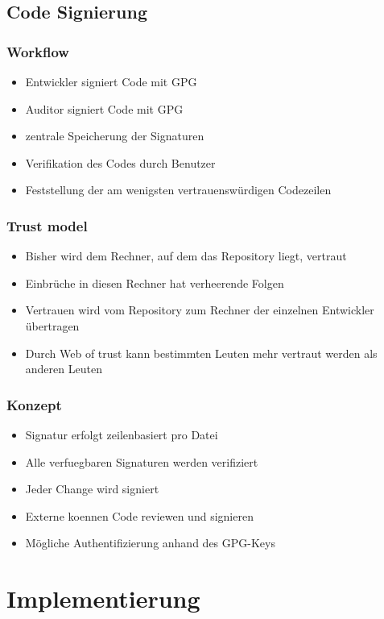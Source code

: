 \documentclass[german]{beamer}
\begin{document}
\subsection{Code Signierung}

\begin{frame}
  \frametitle{Workflow}
  \begin{itemize}
  \item Entwickler signiert Code mit GPG
  \item Auditor signiert Code mit GPG
  \item zentrale Speicherung der Signaturen
  \item Verifikation des Codes durch Benutzer
  \item Feststellung der am wenigsten vertrauensw\"urdigen Codezeilen
  \end{itemize}
\end{frame}

\begin{frame}
  \frametitle{Trust model}
  \begin{itemize}
  \item Bisher wird dem Rechner, auf dem das Repository liegt, vertraut
  \item Einbr\"uche in diesen Rechner hat verheerende Folgen
  \item Vertrauen wird vom Repository zum Rechner der einzelnen Entwickler \"ubertragen
  \item Durch Web of trust kann bestimmten Leuten mehr vertraut werden als anderen Leuten
  \end{itemize}
\end{frame}

\begin{frame}
  \frametitle{Konzept}
  \begin{itemize}
  \item Signatur erfolgt zeilenbasiert pro Datei
  \item Alle verfuegbaren Signaturen werden verifiziert
  \item Jeder Change wird signiert
  \item Externe koennen Code reviewen und signieren
  \item M\"ogliche Authentifizierung anhand des GPG-Keys
  \end{itemize}
\end{frame}

\section{Implementierung}
\end{document}
